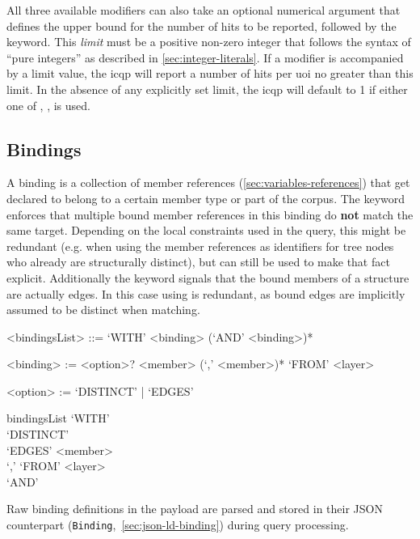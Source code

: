 \documentclass[11pt,a4paper]{report}
\newcommand{\iqlType}[1]{\texttt{\iqlns#1}}
\begin{document}
All three available modifiers can also take an optional numerical argument that defines the upper bound for the number of hits to be reported, followed by the  keyword.
This \textit{limit} must be a positive non-zero integer that follows the syntax of ``pure integers'' as described in \cref{sec:integer-literals}.
If a modifier is accompanied by a limit value, the \ac{icqp} will report a number of hits per \ac{uoi} no greater than this limit.
In the absence of any explicitly set limit, the \ac{icqp} will default to 1 if either one of , ,  is used.

\subsection{Bindings}
\label{sec:bindings}
A binding is a collection of member references (\ref{sec:variables-references}) that get declared to belong to a certain member type or part of the corpus. 
The  keyword enforces that multiple bound member references in this binding do \textbf{not} match the same target. 
Depending on the local constraints used in the query, this might be redundant (e.g. when using the member references as identifiers for tree nodes who already are structurally distinct), but can still be used to make that fact explicit. 
Additionally the  keyword signals that the bound members of a structure are actually edges.
In this case using  is redundant, as bound edges are implicitly assumed to be distinct when matching.

\begin{gram}[Bindings]
	\label{gram:bindings}
	\begin{grammar}	
		<bindingsList> ::= `WITH' <binding> (`AND' <binding>)* 
		
		<binding> := <option>? <member> (`,' <member>)* `FROM' <layer>
		
		<option> := `DISTINCT' | `EDGES'	
	\end{grammar}
	\diagsep
	\begin{rrdiag*}{bindingsList}
		`WITH' \srp
			\sst \\ `DISTINCT' \\ `EDGES' \est {} \\ `,' \erp `FROM' <layer>
			\\ `AND'
		\erp 
	\end{rrdiag*}
\end{gram}

\noindent Raw binding definitions in the payload are parsed and stored in their JSON counterpart (\iqlType{Binding},~\ref{sec:json-ld-binding}) during query processing.
\end{document}
